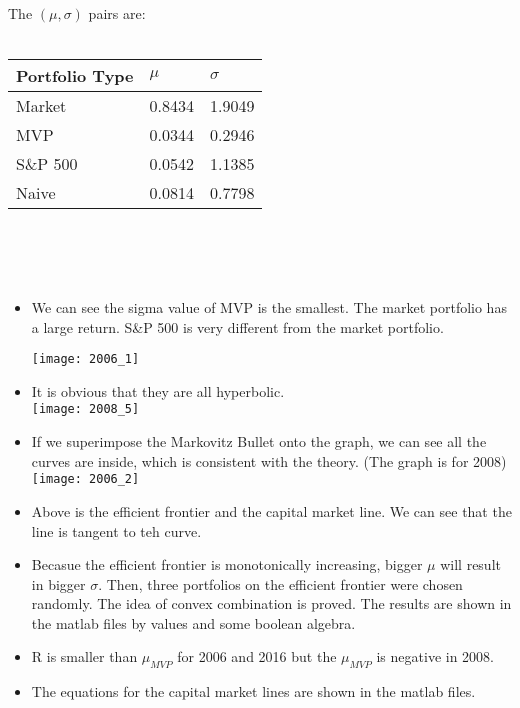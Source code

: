 \documentclass{article}
\begin{document}
The $(\mu,\sigma)$ pairs are:\\ \\
\begin{tabular}{l | l | l}
 Portfolio Type & $\mu$ & $\sigma$ \\\hline
Market & 0.8434&1.9049\\ 
MVP&0.0344&0.2946\\
 S\&P 500& 0.0542&1.1385\\ 
Naive& 0.0814&0.7798\\ 

\end{tabular}
\\ \\ \\
\begin{itemize}
\item  We can see the sigma value of MVP is the smallest. The market portfolio has a large return. S\&P 500 is very different from the market portfolio.

\texttt{[image: 2006\_1]}

\item It is obvious that they are all hyperbolic. \\

\texttt{[image: 2008\_5]}

\item If we superimpose the Markovitz Bullet onto the graph, we can see all the curves are inside, which is consistent with the theory. (The graph is for 2008)\\


\texttt{[image: 2006\_2]}
\item Above is the efficient frontier and the capital market line. We can see that the line is tangent to teh curve.\\

\item Becasue the efficient frontier is monotonically increasing, bigger $\mu$ will result in bigger $\sigma$. Then, three portfolios on the efficient frontier were chosen randomly. The idea of convex combination is proved. The results are shown in the matlab files by values and some boolean algebra.\\

\item R is smaller than $\mu_{MVP}$ for 2006 and 2016 but the $\mu_{MVP}$ is negative in 2008.\\
\item The equations for the capital market lines are shown in the matlab files.


\end{itemize}
\end{document}
